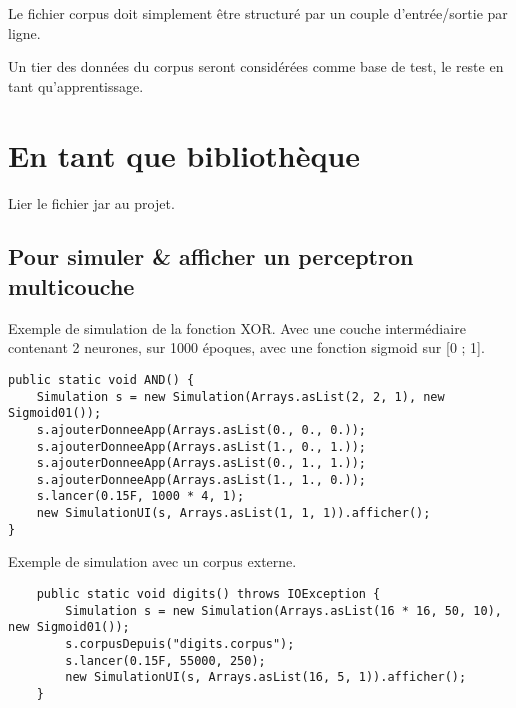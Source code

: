 \documentclass[a4paper,11pt]{article}
\begin{document}
Le fichier corpus doit simplement être structuré par un couple d'entrée/sortie par ligne.

Un tier des données du corpus seront considérées comme base de test, le reste en tant
qu'apprentissage.

\section{En tant que bibliothèque}

Lier le fichier jar au projet.

\subsection{Pour simuler \& afficher un perceptron multicouche}

Exemple de simulation de la fonction XOR. Avec une couche intermédiaire contenant 2 neurones, 
sur 1000 époques, avec une fonction sigmoid sur [0 ; 1].

\begin{lstlisting}
public static void AND() {
	Simulation s = new Simulation(Arrays.asList(2, 2, 1), new Sigmoid01());
	s.ajouterDonneeApp(Arrays.asList(0., 0., 0.));
	s.ajouterDonneeApp(Arrays.asList(1., 0., 1.));
	s.ajouterDonneeApp(Arrays.asList(0., 1., 1.));
	s.ajouterDonneeApp(Arrays.asList(1., 1., 0.));
	s.lancer(0.15F, 1000 * 4, 1);
	new SimulationUI(s, Arrays.asList(1, 1, 1)).afficher();
}
\end{lstlisting}

\newpage
Exemple de simulation avec un corpus externe.
\begin{lstlisting}
	public static void digits() throws IOException {
		Simulation s = new Simulation(Arrays.asList(16 * 16, 50, 10), new Sigmoid01());
		s.corpusDepuis("digits.corpus");
		s.lancer(0.15F, 55000, 250);
		new SimulationUI(s, Arrays.asList(16, 5, 1)).afficher();
	}
\end{lstlisting}
	
\end{document}
